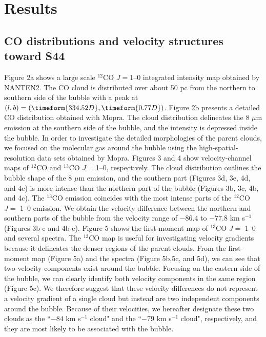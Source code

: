 \documentclass[onecolumn]{pasj01}
\begin{document}
{{{\section{Results}
\subsection{{CO distributions and velocity structures toward S44}}
{Figure 2a shows a large scale $^{12}$CO $J=$1--0 integrated intensity map obtained by NANTEN2. The CO cloud {is distributed over about 50 pc} from the northern to southern side of the bubble {with} a peak at $(l,b)=(\timeform{334.52D}, \timeform{0.77D})$. }
Figure 2b presents a detailed CO distribution {obtained} with Mopra. The cloud distribution delineates the 8 $\mu$m emission at the southern side of the bubble, {and the} intensity {is depressed} inside the bubble.
In order to investigate {{the detailed morphologies} of the parent clouds, we focused on the molecular {gas} around the bubble using the high-spatial-resolution data sets obtained by Mopra.} {Figures 3 and 4} {show} velocity-channel maps of $^{12}$CO and $^{13}$CO $J=$1--0, respectively. 
The cloud distribution {outlines} the bubble shape of the 8 $\mu$m emission, and the southern part {(Figures 3d, 3e, 4d, and 4e)} is more intense than the northern part of the bubble ({Figures 3b, 3c, 4b, and 4c}). The $^{13}$CO emission {coincides with the most} intense part{s} of the $^{12}$CO $J=$ 1--0 emission. We {obtain} the velocity difference between the northern and southern part{s} of the bubble from the velocity range of $-86.4$ {to} ${-77.8}$ km s$^{-1}$ ({Figures 3b-e and 4b-e}).
{Figure 5 shows the first-moment map of $^{13}$CO $J=$ 1--0 and {several} spectra.}
The $^{13}$CO {map} is useful {for investigating} velocity gradient{s} because it delineates the denser regions of the parent clouds. 
{From the first-moment map (Figure 5a) and the spectra (Figure 5b,5c, and 5d),} we can {see} that two velocity components exist around the bubble. 
Focusing on the eastern side of the bubble, we can clearly {identify both} velocity components {in} the same region (Figure 5c).
{We therefore} suggest that these velocity difference{s do not represent} a velocity gradient of a single cloud but {instead are} two independent components around the bubble. {Because of their velocities, we hereafter designate} these two clouds as the “$-84$ km s$^{-1}$ cloud" and {the} “$-79$ km s$^{-1}$ cloud", respectively, {and they} are most likely to be associated with the bubble.

}}}
\end{document}
